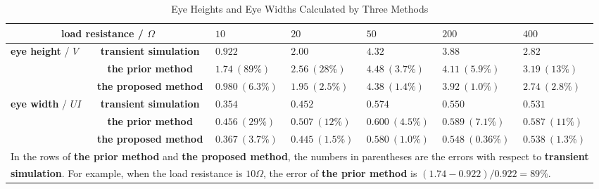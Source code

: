 \documentclass[conference]{IEEEtran}
\begin{document}
\begin{table}[t]
\caption{Eye Heights and Eye Widths Calculated by Three Methods}
\label{TabV}
    \begin{center}
    \begin{tabular}{|p{1.8cm}|p{2.7cm}|p{1.6cm}|p{1.6cm}|p{1.6cm}|p{1.6cm}|p{1.6cm}|}\hline
        \multicolumn{2}{|c|}{\textbf{load resistance} / $\Omega$}
            & $10$
            & $20$
            & $50$
            & $200$
            & $400$ \\ \hline
        \multirow{3}{*}{\textbf{eye height} / $V$} &
        \multicolumn{1}{|c|}{\textbf{transient simulation}}
            & $0.922$
            & $2.00$
            & $4.32$
            & $3.88$
            & $2.82$ \\ \cline{2-7}
        \multicolumn{1}{|c|}{} &
        \multicolumn{1}{|c|}{\textbf{the prior method}}
            & $1.74\ (89\%)$
            & $2.56\ (28\%)$
            & $4.48\ (3.7\%)$
            & $4.11\ (5.9\%)$
            & $3.19\ (13\%)$ \\ \cline{2-7}
        \multicolumn{1}{|c|}{} &
        \multicolumn{1}{|c|}{\textbf{the proposed method}}
            & $0.980\ (6.3\%)$
            & $1.95\ (2.5\%)$
            & $4.38\ (1.4\%)$
            & $3.92\ (1.0\%)$
            & $2.74\ (2.8\%)$ \\ \hline
        \multirow{3}{*}{\textbf{eye width} / $UI$} &
        \multicolumn{1}{|c|}{\textbf{transient simulation}}
            & $0.354$
            & $0.452$
            & $0.574$
            & $0.550$
            & $0.531$ \\ \cline{2-7}
        \multicolumn{1}{|c|}{} &
        \multicolumn{1}{|c|}{\textbf{the prior method}}
            & $0.456\ (29\%)$
            & $0.507\ (12\%)$
            & $0.600\ (4.5\%)$
            & $0.589\ (7.1\%)$
            & $0.587\ (11\%)$ \\ \cline{2-7}
        \multicolumn{1}{|c|}{} &
        \multicolumn{1}{|c|}{\textbf{the proposed method}}
            & $0.367\ (3.7\%)$
            & $0.445\ (1.5\%)$
            & $0.580\ (1.0\%)$
            & $0.548\ (0.36\%)$
            & $0.538\ (1.3\%)$ \\ \hline
        \multicolumn{7}{l}{In the rows of \textbf{the prior method} and \textbf{the proposed method}, the numbers in parentheses are the errors with respect to \textbf{transient}} \\
        \multicolumn{7}{l}{\textbf{simulation}. For example, when the load resistance is $10\Omega$, the error of \textbf{the prior method} is $(1.74-0.922)/0.922=89\%$.}
    \end{tabular}
    \end{center}
\end{table}
\end{document}
